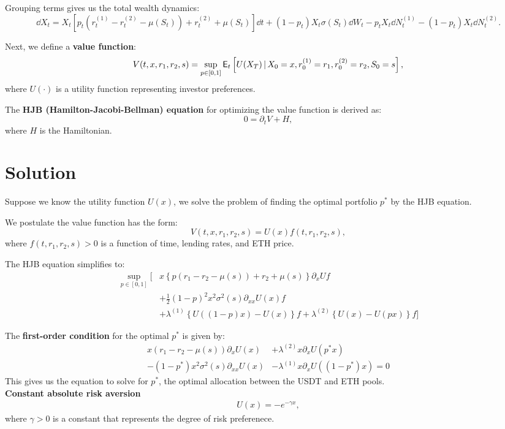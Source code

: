 \documentclass{article} %
\theoremstyle{plain}
\theoremstyle{definition} %
\begin{document}
Grouping terms gives us the total wealth dynamics:
\[
\dd X_t = X_t \left[p_t (r^{(1)}_t - r^{(2)}_t - \mu(S_t)) + r^{(2)}_t + \mu(S_t) \right] \dd t + (1 - p_t) X_t \sigma(S_t) \dd W_t - p_t X_t \dd N^{(1)}_t - (1-p_t) X_t \dd N^{(2)}_t.
\]

Next, we define a \textbf{value function}:
\[
V(t, x, r_1, r_2, s) = \sup_{p \in [0,1]} \mathbb{\sf E}_t \left[ U(X_T) \,|\, X_0 = x, r^{(1)}_0 = r_1, r^{(2)}_0 = r_2, S_0 = s \right],
\]
where $U(\cdot)$ is a utility function representing investor preferences.

The \textbf{HJB (Hamilton-Jacobi-Bellman) equation} for optimizing the value function is derived as:
\[
0 = \partial_t V + H,
\]
where $H$ is the Hamiltonian.

\section{Solution}
Suppose we know the utility function $U(x)$,
 we solve the problem of finding the optimal portfolio $p^*$ by the HJB equation.

We postulate the value function has the form:
\[
V(t, x, r_1, r_2, s) = U(x) f(t, r_1, r_2, s),
\]
where $f(t, r_1, r_2, s)>0$ is a function of time, lending rates, and ETH price.

The HJB equation simplifies to:
\begin{align*}
\sup_{p \in [0, 1]} 
\Big[ &x \left\{ p \left( r_1 - r_2 - \mu(s) \right) + r_2 + \mu(s) \right\}\partial_x U f\\
&+\frac{1}{2}(1-p)^2x^2 \sigma^2(s) \partial_{xx}U(x)f\\
&+\lambda^{(1)}\left\{U((1-p)x) - U(x)\right\}f
+\lambda^{(2)}\left\{U(x) - U(px)\right\}f
\Big]
\end{align*}

The \textbf{first-order condition} for the optimal $p^*$ is given by:
\begin{align*}
x(r_1 - r_2 - \mu(s))\partial_xU(x) &+\lambda^{(2)}x\partial_xU(p^*x)\\
- (1-p^*)x^2\sigma^2(s)\partial_{xx}U(x)
&-\lambda^{(1)}x\partial_xU((1-p^*)x)
=0
\end{align*}
This gives us the equation to solve for $p^*$, the optimal allocation between the USDT and ETH pools.\\

\textbf{Constant absolute risk aversion}
\begin{align*}
  U(x) = -e^{-\gamma x},
  \end{align*}
  where $\gamma>0$ is a constant that represents the degree of risk preferenece.\\
\end{document}
